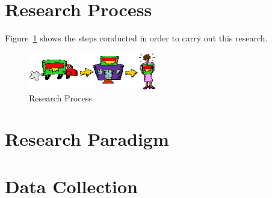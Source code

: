 \section{Research Process}
\label{sec:researchProcess}

Figure~\ref{fig:researchprocess} shows the steps conducted in order to carry out this research. 



 
\begin{figure}[!ht]
  \begin{center}
    \includegraphics[width=0.5\textwidth]{figures/researchprocess.png}
  \end{center}
  \caption{Research Process}
  \label{fig:researchprocess}
\end{figure}

\section{Research Paradigm}
\label{sec:researchParadigm}


\section{Data Collection}
\label{sec:dataCollection}



